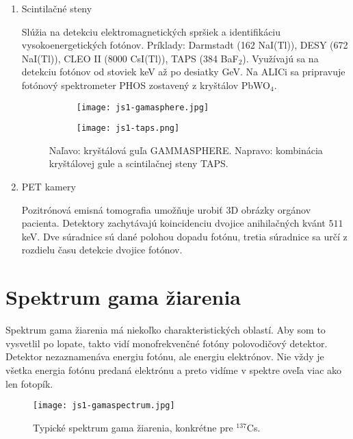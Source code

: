 \documentclass[../../main.tex]{subfiles}
\begin{document}
\begin{enumerate}
\item Scintilačné steny

Slúžia na detekciu elektromagnetických spršiek a identifikáciu vysokoenergetických fotónov. Príklady: Darmstadt (162 NaI(Tl)), DESY (672 NaI(Tl)), CLEO II (8000 CsI(Tl)), TAPS (384 BaF$_2$). Využívajú sa na detekciu fotónov od stoviek keV až po desiatky GeV. Na ALICi sa pripravuje fotónový spektrometer PHOS zostavený z kryštálov PbWO$_4$.

\begin{figure}[h]
\begin{subfigure}[b]{0.45\textwidth}
\centering
\texttt{[image: js1-gamasphere.jpg]}
\end{subfigure}
\begin{subfigure}[b]{0.45\textwidth}
\centering
\texttt{[image: js1-taps.png]}
\end{subfigure}
\caption{Naľavo: kryštálová guľa GAMMASPHERE. Napravo: kombinácia kryštálovej gule a scintilačnej steny TAPS.}
\label{js1:img:gamasphere}
\end{figure}
\newpage
\item PET kamery

Pozitrónová emisná tomografia umožňuje urobiť 3D obrázky orgánov pacienta. Detektory zachytávajú koincidenciu dvojice anihilačných kvánt $511$ keV. Dve súradnice sú dané polohou dopadu fotónu, tretia súradnice sa určí z rozdielu času detekcie dvojice fotónov.
\end{enumerate}

\section{Spektrum gama žiarenia}

Spektrum gama žiarenia má niekoľko charakteristických oblastí. Aby som to vysvetlil po lopate, takto vidí monofrekvenčné fotóny polovodičový detektor. Detektor nezaznamenáva energiu fotónu, ale energiu elektrónov. Nie vždy je všetka energia fotónu predaná elektrónu a preto vidíme v spektre oveľa viac ako len fotopík.

\begin{figure}[h]
\centering
\texttt{[image: js1-gamaspectrum.jpg]}
\caption{Typické spektrum gama žiarenia, konkrétne pre $^{137}$Cs.}
\end{figure}
\end{document}
